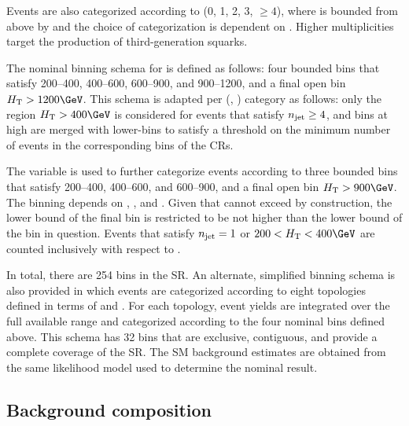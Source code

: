 Events are also categorized according to \nb (0, 1, 2, 3, ${\geq}4$),
where \nb is bounded from above by \njet and the choice of
categorization is dependent on \njet. Higher \nb multiplicities target
the production of third-generation squarks.

The nominal binning schema for \scalht is defined as follows: four
bounded bins that satisfy 200--400, 400--600, 600--900, and
900--1200\GeV, and a final open bin $\scalht > 1200\GeV$. This schema
is adapted per (\njet, \nb) category as follows: only the region
$\scalht > 400\GeV$ is considered for events that satisfy $n_{\mathrm{jet}} \geq
4$, and bins at high \scalht are merged with lower-\scalht bins to
satisfy a threshold on the minimum number of events in the
corresponding bins of the CRs.

The \mht variable is used to further categorize events according to
three bounded bins that satisfy 200--400, 400--600, and 600--900, and
a final open bin $\scalht > 900\GeV$. The \mht binning depends on
\njet, \nb, and \scalht. Given that \mht cannot exceed \scalht by
construction, the lower bound of the final \mht bin is restricted to
be not higher than the lower bound of the \scalht bin in
question. Events that satisfy $n_{\mathrm{jet}} = 1$ or $200 < \scalht < 400\GeV$
are counted inclusively with respect to \mht.

In total, there are 254 bins in the SR. An alternate, simplified
binning schema is also provided in which events are categorized
according to eight topologies defined in terms of \njet and \nb. For
each topology, event yields are integrated over the full available
\scalht range and categorized according to the four nominal \mht bins
defined above. This schema has 32 bins that are exclusive, contiguous,
and provide a complete coverage of the SR. The SM background estimates
are obtained from the same likelihood model used to determine the
nominal result.


\subsection{Background composition}
\label{sec:bkgd}

